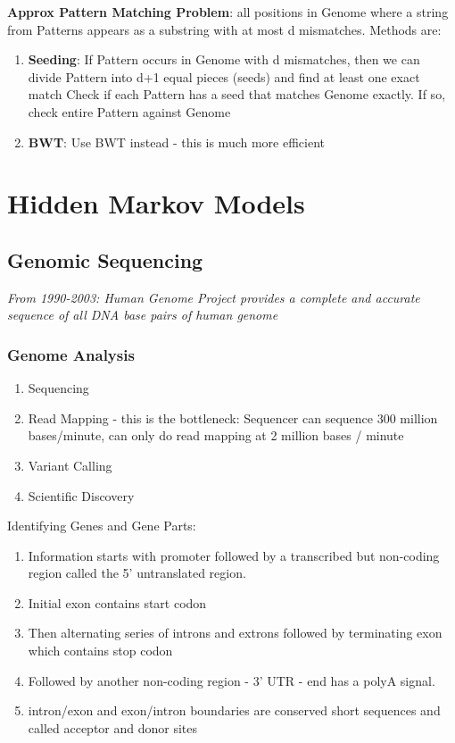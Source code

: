 \documentclass{article}
\begin{document}
\textbf{Approx Pattern Matching Problem}: all positions in Genome where a string from Patterns appears as a substring with at most d mismatches. Methods are:
\begin{enumerate}
    \item \textbf{Seeding}: If Pattern occurs in Genome with d mismatches, then we can divide Pattern into d+1 equal pieces (seeds) and find at least one exact match
    \subitem Check if each Pattern has a seed that matches Genome exactly.
    \subitem If so, check entire Pattern against Genome
    \item \textbf{BWT}: Use BWT instead - this is much more efficient
\end{enumerate}


\section{Hidden Markov Models}
\subsection{Genomic Sequencing}
\textit{From 1990-2003: Human Genome Project provides a complete and accurate sequence of all DNA base pairs of human genome}

\subsubsection{Genome Analysis}
\begin{enumerate}
    \item Sequencing
    \item Read Mapping - this is the bottleneck: Sequencer can sequence 300 million bases/minute, can only do read mapping at 2 million bases / minute
    \item Variant Calling
    \item Scientific Discovery
\end{enumerate}

Identifying Genes and Gene Parts:
\begin{enumerate}
    \item Information starts with promoter followed by a transcribed but non-coding region called the 5' untranslated region.
    \item Initial exon contains start codon
    \item Then alternating series of introns and extrons followed by terminating exon which contains stop codon
    \item Followed by another non-coding region - 3' UTR - end has a polyA signal.
    \item intron/exon and exon/intron boundaries are conserved short sequences and called acceptor and donor sites
\end{enumerate}
\end{document}
